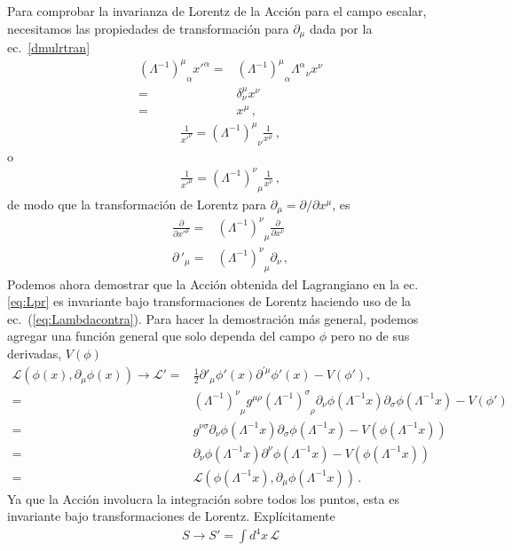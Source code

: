 Para comprobar la invarianza de Lorentz de la Acción para el campo escalar, necesitamos las propiedades de transformación para $\partial_\mu$ dada por la ec.~\eqref{dmulrtran}
\begin{align}
  {\left(\Lambda^{-1}\right)^\mu}_\alpha{x'}^\alpha=&{\left(\Lambda^{-1}\right)^\mu}_\alpha{\Lambda^\alpha}_\nu x^\nu\nonumber\\
=&\delta^\mu_\nu x^\nu\nonumber\\
=&x^\mu\,,
\end{align}
\begin{align}
  \frac{1}{{x'}^\nu}= {\left(\Lambda^{-1}\right)^\mu}_\nu\frac{1}{x^\mu}\,,
\end{align}
o
\begin{align}
  \label{eq:183qft}
    \frac{1}{{x'}^\mu}= {\left(\Lambda^{-1}\right)^\nu}_\mu\frac{1}{x^\nu}\,,
\end{align}
de modo que la transformación de Lorentz para $\partial_\mu=\partial/\partial x^\mu$, es
\begin{align}
  \label{dmulrtran}
   \frac{\partial}{{\partial x'}^\mu}=& {\left(\Lambda^{-1}\right)^\nu}_\mu\frac{\partial}{\partial x^\nu}\nonumber\\
   {\partial\,}'_\mu=& {\left(\Lambda^{-1}\right)^\nu}_\mu\partial_\nu\,,
\end{align}
Podemos ahora demostrar que la Acción obtenida del Lagrangiano en la ec.\eqref{eq:Lpr} es invariante bajo transformaciones de Lorentz haciendo uso de la ec.~(\ref{eq:Lambdacontra}). Para hacer la demostración más general, podemos agregar una función general que solo dependa del campo $\phi$ pero no de sus derivadas, $V(\phi)$
\begin{align}
  \mathcal{L}(\phi(x),\partial_{\mu}\phi(x))\to  \mathcal{L}'=& \frac{1}{2}\partial'_\mu\phi'(x)\partial^{'\mu}\phi'(x)-V(\phi'), \nonumber\\
  =&{\left(\Lambda^{-1}\right)^\nu}_\mu g^{\mu \rho}{\left(\Lambda^{-1}\right)^\sigma}_\rho \partial_\nu\phi(\Lambda^{-1}x) \partial_\sigma \phi(\Lambda^{-1}x) -V(\phi')\nonumber\\
  =& g^{\nu \sigma}\partial_\nu\phi(\Lambda^{-1}x) \partial_\sigma \phi(\Lambda^{-1}x) -V(\phi(\Lambda^{-1}x))\nonumber\\
  =& \partial_\nu\phi(\Lambda^{-1}x) \partial^{\nu} \phi(\Lambda^{-1}x) -V(\phi(\Lambda^{-1}x)) \nonumber\\
  =&\mathcal{L}(\phi(\Lambda^{-1}x),\partial_{\mu}\phi(\Lambda^{-1}x))\,.
\end{align}
Ya que la Acción involucra la integración sobre todos los puntos, esta es invariante bajo transformaciones de Lorentz. Explícitamente
\begin{align}
  S\to S'=\int d^4x\, \mathcal{L}
\end{align}

